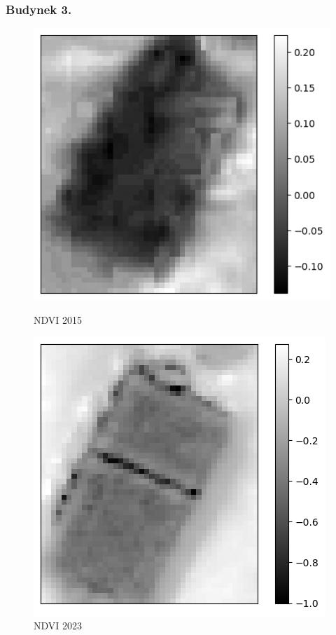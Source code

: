 \documentclass[a4paper,12pt]{article}  %
\begin{document}
\subsubsection{Budynek 3.}

\begin{figure}[H]
    \centering
    \begin{minipage}{0.45\textwidth}
        \centering
        \includegraphics[width=\linewidth]{spektralne/ndvi_budynek3_2015.png}
        \caption*{NDVI 2015}
    \end{minipage}
    \begin{minipage}{0.45\textwidth}
        \centering
        \includegraphics[width=\linewidth]{spektralne/ndvi_budynek3_2023.png}
        \caption*{NDVI 2023}
    \end{minipage}
\end{figure}
\end{document}
